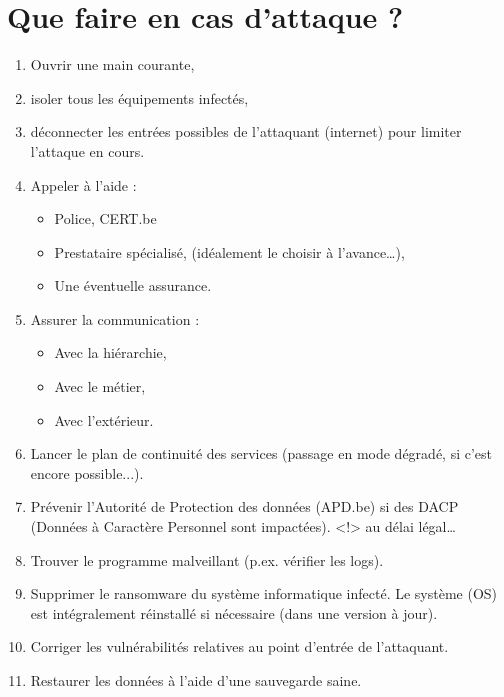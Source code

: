 \documentclass[a4paper]{article}
\begin{document}
\section{Que faire en cas d'attaque ?}





\begin{enumerate}
    \item Ouvrir une main courante,
    \item isoler tous les équipements infectés,
    \item déconnecter les entrées possibles de l'attaquant (internet) pour limiter l'attaque en cours.
    \item Appeler à l'aide :
    \begin{itemize}
        \item Police, CERT.be
        \item Prestataire spécialisé, (idéalement le choisir à l'avance…),
        \item Une éventuelle assurance.
    \end{itemize}
    \item Assurer la communication :
    \begin{itemize}
        \item Avec la hiérarchie,
        \item Avec le métier,
        \item Avec l'extérieur.
    \end{itemize}
    \item Lancer le plan de continuité des services (passage en mode dégradé, si c'est encore possible...).
    \item Prévenir l'Autorité de Protection des données (APD.be) si des DACP (Données à Caractère Personnel sont impactées). <!> au délai légal…
    \item Trouver le programme malveillant (p.ex. vérifier les logs).
    \item Supprimer le ransomware du système informatique infecté. Le système (OS) est
    intégralement réinstallé si nécessaire (dans une version à jour).
    \item Corriger les vulnérabilités relatives au point d'entrée de l'attaquant.
    \item Restaurer les données à l’aide d'une sauvegarde saine.
\end{enumerate}
\end{document}
